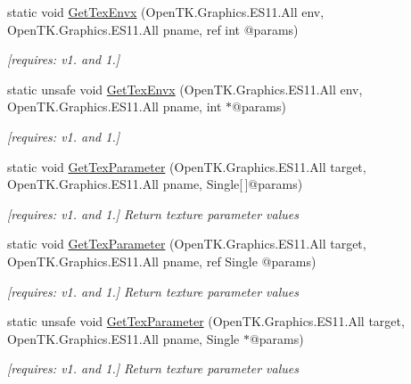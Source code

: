 \begin{DoxyCompactItemize}
static void \hyperlink{class_open_t_k_1_1_graphics_1_1_e_s11_1_1_g_l_aab4c58223d836b07fbe0ceeed88075e9}{Get\-Tex\-Envx} (Open\-T\-K.\-Graphics.\-E\-S11.\-All env, Open\-T\-K.\-Graphics.\-E\-S11.\-All pname, ref int @params)
\begin{DoxyCompactList}\small\item\em \mbox{[}requires\-: v1. and 1.\mbox{]}\end{DoxyCompactList}\item 
static unsafe void \hyperlink{class_open_t_k_1_1_graphics_1_1_e_s11_1_1_g_l_acfa3c2f33c0d5aa6ed0ed2ec6b8133b1}{Get\-Tex\-Envx} (Open\-T\-K.\-Graphics.\-E\-S11.\-All env, Open\-T\-K.\-Graphics.\-E\-S11.\-All pname, int $\ast$@params)
\begin{DoxyCompactList}\small\item\em \mbox{[}requires\-: v1. and 1.\mbox{]}\end{DoxyCompactList}\item 
static void \hyperlink{class_open_t_k_1_1_graphics_1_1_e_s11_1_1_g_l_ac0653951ac447e7af0e9288953499019}{Get\-Tex\-Parameter} (Open\-T\-K.\-Graphics.\-E\-S11.\-All target, Open\-T\-K.\-Graphics.\-E\-S11.\-All pname, Single\mbox{[}$\,$\mbox{]}@params)
\begin{DoxyCompactList}\small\item\em \mbox{[}requires\-: v1. and 1.\mbox{]} Return texture parameter values \end{DoxyCompactList}\item 
static void \hyperlink{class_open_t_k_1_1_graphics_1_1_e_s11_1_1_g_l_afbf0dcbd3df67f17885ca9728b6c7fdb}{Get\-Tex\-Parameter} (Open\-T\-K.\-Graphics.\-E\-S11.\-All target, Open\-T\-K.\-Graphics.\-E\-S11.\-All pname, ref Single @params)
\begin{DoxyCompactList}\small\item\em \mbox{[}requires\-: v1. and 1.\mbox{]} Return texture parameter values \end{DoxyCompactList}\item 
static unsafe void \hyperlink{class_open_t_k_1_1_graphics_1_1_e_s11_1_1_g_l_a3399df40f5be74d2af9897a59893b50a}{Get\-Tex\-Parameter} (Open\-T\-K.\-Graphics.\-E\-S11.\-All target, Open\-T\-K.\-Graphics.\-E\-S11.\-All pname, Single $\ast$@params)
\begin{DoxyCompactList}\small\item\em \mbox{[}requires\-: v1. and 1.\mbox{]} Return texture parameter values \end{DoxyCompactList}\item 

\end{DoxyCompactItemize}
